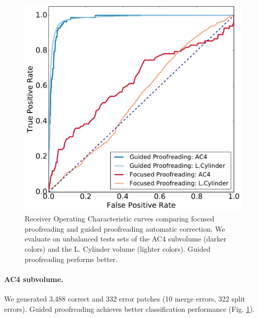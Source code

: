 \begin{figure}[t]
\centering
\includegraphics[width=0.9\linewidth]{gfx/roc.pdf}
\caption{Receiver Operating Characteristic curves comparing focused proofreading and guided proofreading automatic correction. We evaluate on unbalanced tests sets of the AC4 subvolume (darker colors) and the L. Cylinder volume (lighter colors). Guided proofreading performs better.}
\label{fig:pr}
\end{figure}

\paragraph{AC4 subvolume.} We generated 3,488 correct and 332 error patches (10 merge errors, 322 split errors). Guided proofreading achieves better classification performance (Fig. \ref{fig:pr}).


